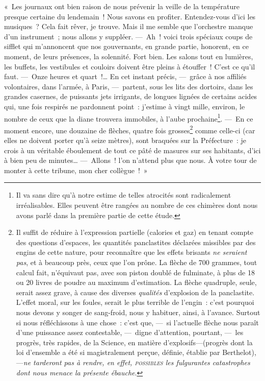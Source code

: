 \documentclass[french,twoside]{book} %
\begin{document}
« Les journaux ont bien raison de nous prévenir la veille de la température presque certaine du lendemain ! Nous savons en profiter. Entendez-vous d’ici les musiques ? Cela fait rêver, je trouve. Mais il me semble que l’orchestre manque d’un instrument ; nous allons y suppléer. — Ah ! voici trois spéciaux coups de sifflet qui m’annoncent que nos gouvernants, en grande partie, honorent, en ce moment, de leurs présences, la solennité. Fort bien. Les salons tout en lumières, les buffets, les vestibules et couloirs doivent être pleins à étouffer ! C’est ce qu’il faut. — Onze heures et quart !… En cet instant précis, — grâce à nos affiliés volontaires, dans l’armée, à Paris, — partent, sous les lits des dortoirs, dans les grandes casernes, de puissants jets irrigants, de longues lignées de certains acides qui, une fois respirés ne pardonnent point : j’estime à vingt mille,   environ, le nombre de ceux que la diane trouvera immobiles, à l’aube prochaine\footnote{Il va sans dire qu’à notre estime de telles atrocités sont radicalement irréalisables. Elles peuvent être rangées au nombre de ces chimères dont nous avons parlé dans la première partie de cette étude.}. — En ce moment encore, une douzaine de flèches, quatre fois grosses\footnote{Il suffit de réduire à l’expression partielle (calories et gaz) en tenant compte des questions d’espaces, les quantités panclastites déclarées missibles par des engins de cette nature, pour reconnaître que les effets brisants \emph{ne seraient pas}, et à beaucoup près, ceux que l’on prône. La flèche de 700 grammes, tout calcul fait, n’équivaut pas, avec son piston doublé de fulminate, à plus de 18 ou 20 livres de poudre au maximum d’estimation. La flèche quadruple, seule, serait assez grave, à cause des diverses \emph{qualités} d’explosion de la panclastite. L’effet moral, sur les foules, serait le plus terrible de l’engin : c’est pourquoi nous devons y songer de sang-froid, nous y habituer, ainsi, à l’avance. Surtout si nous réfléchissons à une chose : c’est que, — si l’actuelle flèche nous paraît d’une puissance assez contestable, — digne d’attention, pourtant, — les progrès, très rapides, de la Science, en matière d’explosifs—(progrès dont la loi d’ensemble a été si magistralement perçue, définie, établie par Berthelot), —\emph{ne tarderont pas à rendre, en effet, {\scshape possibles} les fulgurantes catastrophes dont nous menace la présente ébauche}.} comme celle-ci (car elles ne doivent porter qu’à seize mètres), sont braquées sur la   Préfecture : je crois à un véritable éboulement de tout ce pâté de masures sur ses habitants, d’ici à bien peu de minutes… — Allons ! l’on n’attend plus que nous. À votre tour de monter à cette tribune, mon cher collègue ! »\par
\end{document}
